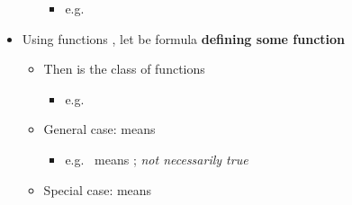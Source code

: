 \begin{itemize}
\begin{itemize}
                \begin{itemize}

                  \item
                        e.g.~
                \end{itemize}
        \end{itemize}
  \item
        Using functions , let
         be formula
        \textbf{defining some function}

        \begin{itemize}

          \item
                Then  is the class
                of functions

                \begin{itemize}

                  \item
                        e.g.~
                \end{itemize}
          \item
                General case:
                means

                \begin{itemize}

                  \item
                        e.g.~
                        means
                        ;
                        \emph{not necessarily true}
                \end{itemize}
          \item
                Special case: 
                means 


\end{itemize}
\end{itemize}
